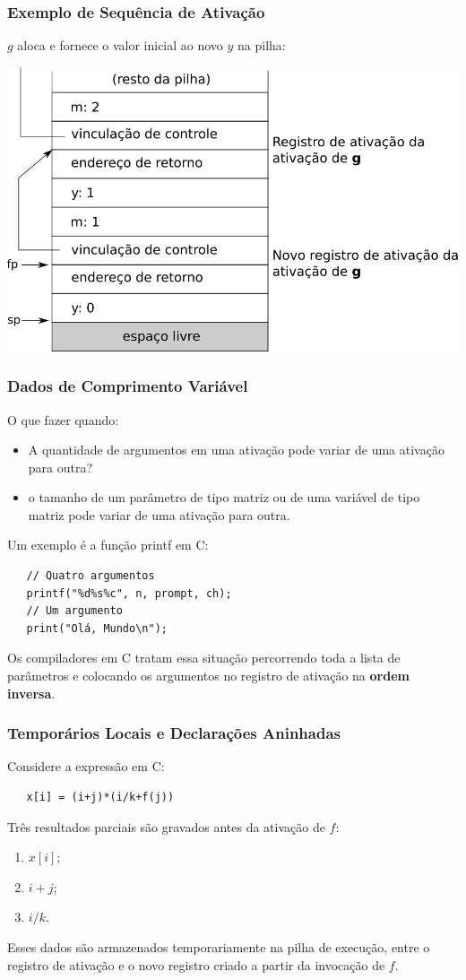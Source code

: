 \documentclass[table]{beamer}
\begin{document}
\begin{frame}
   \frametitle{Exemplo de Sequência de Ativação}
   $g$ aloca e fornece o valor inicial ao novo $y$ na pilha: \\
   \begin{center}
   \includegraphics[width=\linewidth,height=\textheight,keepaspectratio]{figuras/sequenciaativacao05.png}
   \end{center}
\end{frame}

\begin{frame}[fragile]
   \frametitle{Dados de Comprimento Variável}
   O que fazer quando:
   \begin{itemize}
      \item A quantidade de argumentos em uma ativação pode variar de uma ativação para outra?
      \item o tamanho de um parâmetro de tipo matriz ou de uma variável de tipo matriz pode variar de uma ativação para outra.
   \end{itemize}
   Um exemplo é a função \textsf{printf} em C:
   \begin{verbatim}
   // Quatro argumentos
   printf("%d%s%c", n, prompt, ch);
   // Um argumento
   print("Olá, Mundo\n");
   \end{verbatim}
   Os compiladores em C tratam essa situação percorrendo toda a lista de parâmetros e colocando os argumentos no registro de ativação na \textbf{ordem inversa}.
\end{frame}

\begin{frame}[fragile]
   \frametitle{Temporários Locais e Declarações Aninhadas}
   Considere a expressão em C:
   \begin{verbatim}
   x[i] = (i+j)*(i/k+f(j))
   \end{verbatim}
   Três resultados parciais são gravados antes da ativação de $f$:
   \begin{enumerate}
      \item $x[i]$;
      \item $i+j$;
      \item $i/k$.
   \end{enumerate}
   Esses dados são armazenados temporariamente na pilha de execução, entre o registro de ativação e o novo registro criado a partir da invocação de $f$.
\end{frame}
\end{document}

